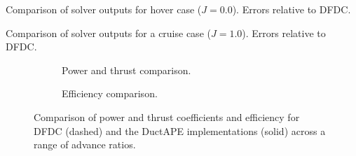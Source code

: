 \begin{table}[h!]
    \caption{Comparison of solver outputs for hover case (\(J=0.0\)). Errors relative to DFDC.}
    \begin{subtable}[t]{0.35\textwidth}
        \begin{center}
            
        \end{center}
    \end{subtable}

    \begin{subtable}[t]{0.45\textwidth}
        \begin{center}
            
        \end{center}
    \end{subtable}
    \label{tab:hovercompsinglerotor}
\end{table}

\begin{table}[h!]
    \caption{Comparison of solver outputs for a cruise case (\(J=1.0\)). Errors relative to DFDC.}
    \begin{subtable}[t]{0.35\textwidth}
        \begin{center}
            
        \end{center}
    \end{subtable}

    \begin{subtable}[t]{0.45\textwidth}
        \begin{center}
            
        \end{center}
    \end{subtable}
    \label{tab:cruisecompsinglerotor}
\end{table}

\begin{figure}[h!]
     \centering
     \begin{subfigure}[t]{0.45\textwidth}
         \centering
        
        \caption{Power and thrust comparison.}
        \label{fig:singlerotorcpct}
     \end{subfigure}
\hfill
     \begin{subfigure}[t]{0.45\textwidth}
         \centering
         
         \caption{Efficiency comparison.}
        \label{fig:singlerotoreta}
     \end{subfigure}
    \caption{Comparison of power and thrust coefficients and efficiency for DFDC (dashed) and the DuctAPE implementations (solid) across a range of advance ratios.}
    \label{fig:singlerotorcpcteta}
\end{figure}


